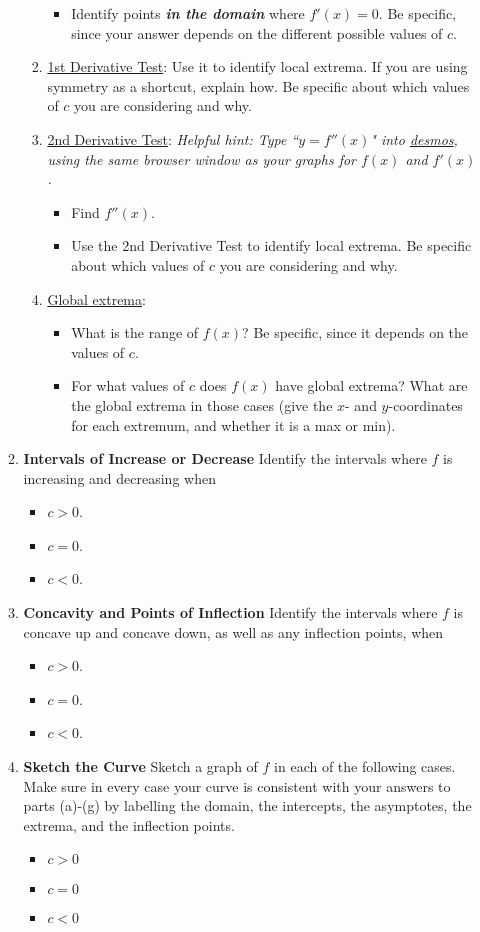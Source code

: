 \documentclass[%
]{article}
\begin{document}
\begin{enumerate}
\begin{enumerate}
\begin{enumerate}
\begin{itemize}
			\item Identify points \textbf{\textit{in the domain}} where $f'(x)=0$.  Be specific, since your answer depends on the different possible values of $c$.  
			\end{itemize}
		\item \underline{1st Derivative Test}:  Use it to identify local extrema.  If you are using symmetry as a shortcut, explain how.  Be specific about which values of $c$ you are considering and why.  
		\item \underline{2nd Derivative Test}:  \textit{Helpful hint: Type ``$y=f''(x)$" into \url{desmos}, using the same browser window as your graphs for $f(x)$ and $f'(x)$.}
			\begin{itemize}
			\item Find $f''(x)$.  
			\item Use the 2nd Derivative Test to identify local extrema.  Be specific about which values of $c$ you are considering and why.	
			\end{itemize}
		\item \underline{Global extrema}:
			\begin{itemize}
			\item What is the range of $f(x)$?  Be specific, since it depends on the values of $c$.
			\item For what values of $c$ does $f(x)$ have global extrema?  What are the global extrema in those cases (give the $x$- and $y$-coordinates for each extremum, and whether it is a max or min).
			\end{itemize}
		\end{enumerate}
	\item \textbf{Intervals of Increase or Decrease} Identify the intervals where $f$ is increasing and decreasing when
		\begin{itemize}
		\item $c>0$.
		\item $c=0$.
		\item $c<0$.
		\end{itemize}
	\item \textbf{Concavity and Points of Inflection} Identify the intervals where $f$ is concave up and concave down, as well as any inflection points, when
		\begin{itemize}
		\item $c>0$.
		\item $c=0$.
		\item $c<0$.
		\end{itemize}
	\item \textbf{Sketch the Curve} Sketch a graph of $f$ in each of the following cases.  Make sure in every case your curve is consistent with your answers to parts (a)-(g) by labelling	the domain, the intercepts, the asymptotes, the extrema, and the inflection points.
		\begin{itemize}
		\item $c>0$
		\item $c=0$
		\item $c<0$
		\end{itemize}
	\end{enumerate}	
	
\end{enumerate}
\end{document}
